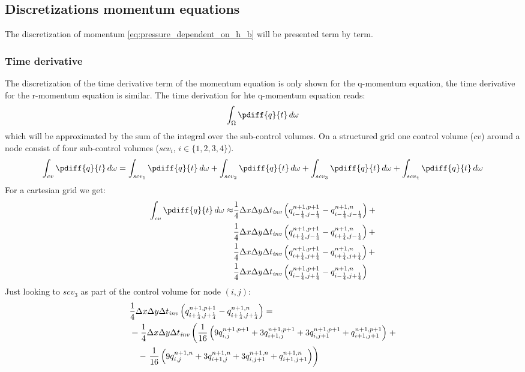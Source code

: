 \subsection{Discretizations momentum equations}
The discretization of momentum \autoref{eq:pressure_dependent_on_h_b} will be presented term by term.
\subsubsection{Time derivative}
The discretization of the time derivative term of the momentum equation is only shown for the q-momentum equation, the time derivative for the r-momentum equation is similar. The time derivation for hte q-momentum equation reads:
\begin{align}
    \int_{\Omega} \pdiff{q}{t}\, d\omega
\end{align}
which will be approximated by the sum of the integral over the sub-control volumes.
On a structured grid one control volume ($cv$) around a node consist of four sub-control volumes ($scv_i$, $i\in\{1,2,3,4\}$).
\begin{align}
    \int_{cv} \pdiff{q}{t}\, d\omega =
    \int_{scv_1} \pdiff{q}{t}\, d\omega +
    \int_{scv_2} \pdiff{q}{t}\, d\omega +
    \int_{scv_3} \pdiff{q}{t}\, d\omega +
    \int_{scv_4} \pdiff{q}{t}\, d\omega
\end{align}
For a cartesian grid we get:
\begin{align}
    \int_{cv} \pdiff{q}{t}\, d\omega \approx &
    \quart\Dx\Dy\Dtinv \left( q^{n+1,p+1}_{i-\quart, j-\quart} -  q^{n+1,n}_{i-\quart, j-\quart} \right) +
    \nonumber \\*
    &\quart\Dx\Dy\Dtinv \left( q^{n+1,p+1}_{i+\quart, j-\quart} -  q^{n+1,n}_{i+\quart, j-\quart} \right) +
    \nonumber \\*
    &\quart\Dx\Dy\Dtinv \left( q^{n+1,p+1}_{i+\quart, j+\quart} -  q^{n+1,n}_{i+\quart, j+\quart} \right) +
    \nonumber \\*
    &\quart\Dx\Dy\Dtinv \left( q^{n+1,p+1}_{i-\quart, j+\quart} -  q^{n+1,n}_{i-\quart, j+\quart} \right)
\end{align}
Just looking to $scv_3$ as part of the control volume for node $(i,j)$:
\begin{align}
    &\frac{1}{4}\Delta x\Delta y\Delta t_{\it{inv}} \left( q^{n+1,p+1}_{i+\frac{1}{4}, j+\frac{1}{4}} -  q^{n+1,n}_{i+\frac{1}{4}, j+\frac{1}{4}} \right) =
    \\*
    &= \frac{1}{4}\Delta x\Delta y\Delta t_{\it{inv}} \left( \frac{1}{16}\left( 9 q^{n+1,p+1}_{i, j} + 3 q^{n+1,p+1}_{i+1,j}  + 3 q^{n+1,p+1}_{i, j+1} + q^{n+1,p+1}_{i+1, j+1}\right) \right. +
    \\*
    &\quad - \left. \frac{1}{16}\left( 9 q^{n+1,n}_{i, j} +  3 q^{n+1,n}_{i+1,j}  + 3  q^{n+1,n}_{i, j+1} + q^{n+1,n}_{i+1, j+1}\right)\right)
\end{align}


